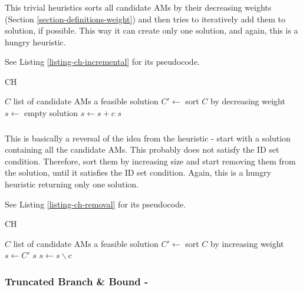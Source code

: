 \subsubsection{}

This trivial heuristics sorts all candidate AMs by their decreasing weights (Section \ref{section-definitions-weight}) and then tries to iteratively add them to solution, if possible. This way it can create only one solution, and again, this is a hungry heuristic.

See Listing \ref{listing-ch-incremental} for its pseudocode.

\begin{algorithm}
\caption{ CH}
\label{listing-ch-incremental}
\begin{algorithmic}
\REQUIRE $C$ list of candidate AMs
\ENSURE a feasible solution
\STATE $C' \gets $ sort $C$ by decreasing weight
\STATE $s \gets $ empty solution
    \STATE $s \gets s + c$
  \ENDIF
\ENDFOR
\RETURN $s$
\end{algorithmic}
\end{algorithm}

\subsubsection{}

This is basically a reversal of the idea from the  heuristic - start with a solution containing all the candidate AMs. This probably does not satisfy the ID set condition. Therefore, sort them by increasing size and start removing them from the solution, until it satisfies the ID set condition. Again, this is a hungry heuristic returning only one solution.

See Listing \ref{listing-ch-removal} for its pseudocode.

\begin{algorithm}
\caption{ CH}
\label{listing-ch-removal}
\begin{algorithmic}
\REQUIRE $C$ list of candidate AMs
\ENSURE a feasible solution
\STATE $C' \gets $ sort $C$ by increasing weight
\STATE $s \gets C'$
    \RETURN $s$
  \ENDIF
  \STATE $s \gets s \backslash c$
\ENDFOR
\end{algorithmic}
\end{algorithm}

\subsubsection{Truncated Branch \& Bound - }

